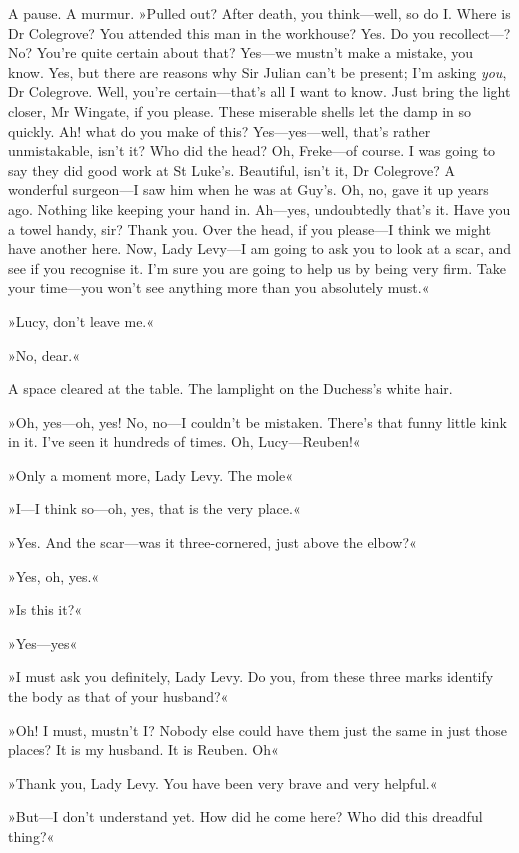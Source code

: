 A pause. A murmur. »Pulled out? After death, you think—well, so do I. Where is Dr Colegrove? You attended this man in the workhouse? Yes. Do you recollect---? No? You're quite certain about that? Yes—we mustn't make a mistake, you know. Yes, but there are reasons why Sir Julian can't be present; I'm asking \textit{you}, Dr Colegrove. Well, you're certain—that's all I want to know. Just bring the light closer, Mr Wingate, if you please. These miserable shells let the damp in so quickly. Ah! what do you make of this? Yes—yes—well, that's rather unmistakable, isn't it? Who did the head? Oh, Freke—of course. I was going to say they did good work at St Luke's. Beautiful, isn't it, Dr Colegrove? A wonderful surgeon—I saw him when he was at Guy's. Oh, no, gave it up years ago. Nothing like keeping your hand in. Ah—yes, undoubtedly that's it. Have you a towel handy, sir? Thank you. Over the head, if you please—I think we might have another here. Now, Lady Levy—I am going to ask you to look at a scar, and see if you recognise it. I'm sure you are going to help us by being very firm. Take your time—you won't see anything more than you absolutely must.«

»Lucy, don't leave me.«

»No, dear.«

A space cleared at the table. The lamplight on the Duchess's white hair.

»Oh, yes—oh, yes! No, no—I couldn't be mistaken. There's that funny little kink in it. I've seen it hundreds of times. Oh, Lucy—Reuben!«

»Only a moment more, Lady Levy. The mole\longdash«

»I—I think so—oh, yes, that is the very place.«

»Yes. And the scar—was it three-cornered, just above the elbow?«

»Yes, oh, yes.«

»Is this it?«

»Yes—yes\longdash«

»I must ask you definitely, Lady Levy. Do you, from these three marks identify the body as that of your husband?«

»Oh! I must, mustn't I? Nobody else could have them just the same in just those places? It is my husband. It is Reuben. Oh\longdash«

»Thank you, Lady Levy. You have been very brave and very helpful.«

»But—I don't understand yet. How did he come here? Who did this dreadful thing?«

